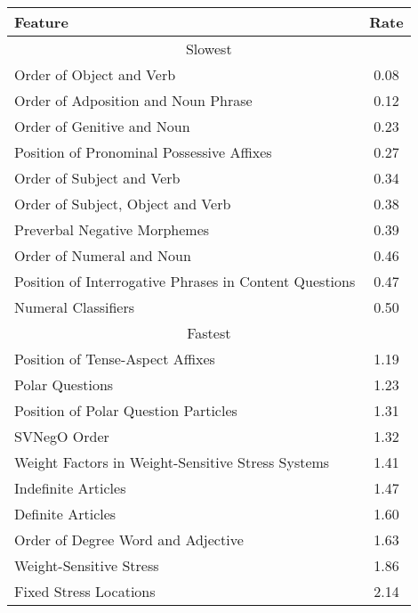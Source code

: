 \begin{tabular}{|l|c|}
	\hline
	Feature & Rate  \\ \hline
	\multicolumn{2}{|c|}{Slowest} \\ \hline
Order of Object and Verb & 0.08 \\
Order of Adposition and Noun Phrase & 0.12 \\
Order of Genitive and Noun & 0.23 \\
Position of Pronominal Possessive Affixes & 0.27 \\
Order of Subject and Verb & 0.34 \\
Order of Subject, Object and Verb & 0.38 \\
Preverbal Negative Morphemes & 0.39 \\
Order of Numeral and Noun & 0.46 \\
Position of Interrogative Phrases in Content Questions & 0.47 \\
Numeral Classifiers & 0.50 \\
\hline
\multicolumn{2}{|c|}{Fastest} \\ \hline
Position of Tense-Aspect Affixes & 1.19 \\
Polar Questions & 1.23 \\
Position of Polar Question Particles & 1.31 \\
SVNegO Order & 1.32 \\
Weight Factors in Weight-Sensitive Stress Systems & 1.41 \\
Indefinite Articles & 1.47 \\
Definite Articles & 1.60 \\
Order of Degree Word and Adjective & 1.63 \\
Weight-Sensitive Stress & 1.86 \\
Fixed Stress Locations & 2.14 \\
\hline
\end{tabular}
